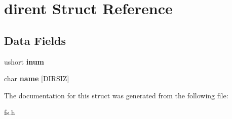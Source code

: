 \hypertarget{structdirent}{}\section{dirent Struct Reference}
\label{structdirent}
\subsection*{Data Fields}
\begin{DoxyCompactItemize}
\item 
ushort {\bfseries inum}\hypertarget{structdirent_a68698c303a46d2a34232a2226629ac79}{}\label{structdirent_a68698c303a46d2a34232a2226629ac79}

\item 
char {\bfseries name} \mbox{[}D\+I\+R\+S\+IZ\mbox{]}\hypertarget{structdirent_a4e08a84dbac9b9f6a3e006151855d14d}{}\label{structdirent_a4e08a84dbac9b9f6a3e006151855d14d}

\end{DoxyCompactItemize}


The documentation for this struct was generated from the following file\+:\begin{DoxyCompactItemize}
\item 
fs.\+h\end{DoxyCompactItemize}
